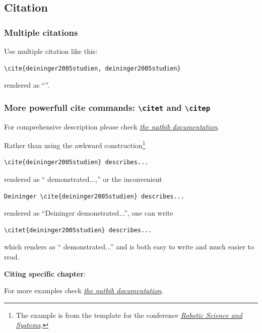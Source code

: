 \subsection{Citation}


\subsubsection{Multiple citations}
Use multiple citation like this:
{\small
\begin{verbatim}
\cite{deininger2005studien, deininger2005studien}
\end{verbatim}
}
rendered as ``\cite{deininger2005studien, deininger2005studien}''.


\subsubsection{More powerfull cite commands: \texttt{\textbackslash citet} and \texttt{\textbackslash citep}}
For comprehensive description please check \href{http://merkel.texture.rocks/Latex/natbib.php}{\textit{the natbib documentation}}.

Rather than using the awkward construction\footnote{The example is from the template for the conference \href{http://www.roboticsconference.org/information/authorinfo/}{\textit{Robotic Science and Systems}}.}
{\small
\begin{verbatim}
\cite{deininger2005studien} describes...
\end{verbatim}
}
\noindent
rendered as ``\cite{deininger2005studien} demonstrated...,'' or the inconvenient
{\small
\begin{verbatim}
Deininger \cite{deininger2005studien} describes...
\end{verbatim}
}
\noindent
rendered as ``Deininger \cite{deininger2005studien} demonstrated...'', one can write
{\small
\begin{verbatim}
\citet{deininger2005studien} describes...
\end{verbatim}
}
\noindent
which renders as ``\citet{deininger2005studien} demonstrated...'' and is
both easy to write and much easier to read.


\textbf{Citing specific chapter}:

\citet[sec. III]{Kroger2008MultiSensor}

\citep[sec. III]{Kroger2008MultiSensor}

For more examples check \href{http://merkel.texture.rocks/Latex/natbib.php}{\textit{the natbib documentation}}.

